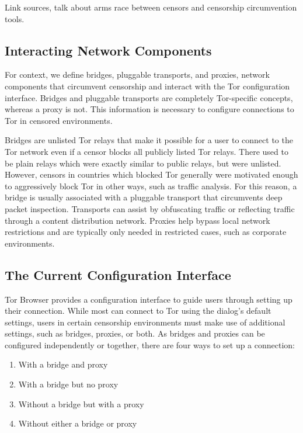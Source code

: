 \documentclass[USenglish,oneside,twocolumn]{article}
\begin{document}
{\color{red} Link sources, talk about arms race between censors and censorship circumvention tools.} 

\subsection{Interacting Network Components} 
For context, we define bridges, pluggable transports, and proxies, network components that 
circumvent censorship and interact with the Tor configuration interface. 
Bridges and pluggable transports are completely Tor-specific concepts, whereas a proxy is not.  
This information is necessary to configure connections to Tor in censored environments. 

Bridges are unlisted Tor relays that make it possible for a user to connect
to the Tor network even if a censor blocks all publicly listed Tor relays. There used 
to be plain relays which were exactly similar to public relays, but were unlisted. However, 
censors in countries which blocked Tor generally were motivated enough to aggressively
block Tor in other ways, such as traffic analysis. For this reason, a bridge is usually associated
with a pluggable transport that circumvents deep packet inspection. Transports can
assist by obfuscating traffic or reflecting traffic through a content distribution network. 
Proxies help bypass local network restrictions and are typically only
needed in restricted cases, such as corporate environments.

\subsection{The Current Configuration Interface} 
Tor Browser provides a configuration interface to guide users through setting up 
their connection. While most can connect to Tor using the
dialog's default settings, users in certain censorship environments must
make use of additional settings, such as bridges, proxies, or both. As bridges and proxies can be configured independently or together, there are
four ways to set up a connection:\\

\begin{enumerate}
    \item With a bridge and proxy
    \item With a bridge but no proxy
    \item Without a bridge but with a proxy
    \item Without either a bridge or proxy
\end{enumerate}
\end{document}
